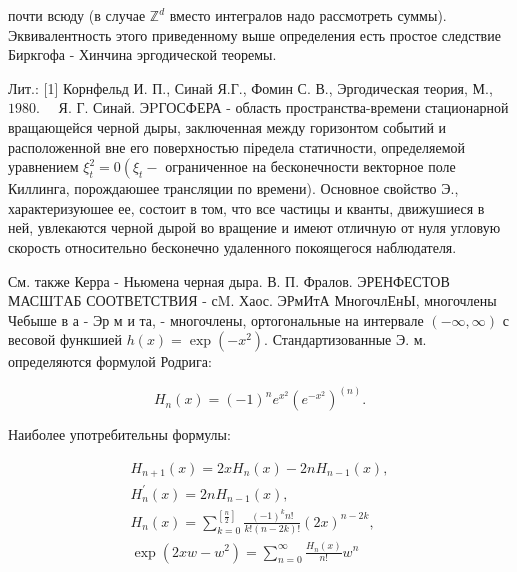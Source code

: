 \documentclass[10pt]{article}
\begin{document}
почти всюду (в случае $\mathbb{Z}^{d}$ вместо интегралов надо рассмотреть суммы). Эквивалентность этого приведенному выше определения есть простое следствие Биркгофа - Хинчина эргодической теоремы.



Лит.: [1] Корнфельд И. П., Синай Я.Г., Фомин С. В., Эргодическая теория, М., $1980 . \quad$ Я. Г. Синай. ЭPГОСФЕРА - область пространства-времени стационарной вращающейся черной дыры, заключенная между горизонтом событий и расположенной вне его поверхностью піредела статичности, определяемой уравнением $\xi_{t}^{2}=0\left(\xi_{t}-\right.$ ограниченное на бесконечности векторное поле Киллинга, порождаюшее трансляции по времени). Основное свойство Э., характеризуюшее ее, состоит в том, что все частицы и кванты, движушиеся в ней, увлекаются черной дырой во вращение и имеют отличную от нуля угловую скорость относительно бесконечно удаленного покоящегося наблюдателя.



См. также Керра - Ньюмена черная дыра. В. П. Фралов. ЭРЕНФЕСТОВ МАСШTАБ СООТВЕТСТВИЯ - сM. Хаос. ЭРмИтА МногочлЕнЫ, многочлены Чебыше в а - Эр м и та, - многочлены, ортогональные на интервале $(-\infty, \infty)$ с весовой функшией $h(x)=\exp \left(-x^{2}\right)$. Стандартизованные Э. м. определяются формулой Родрига:



\[

H_{n}(x)=(-1)^{n} e^{x^{2}}\left(e^{-x^{2}}\right)^{(n)} .

\]



Наиболее употребительны формулы:



\[

\begin{gathered}

H_{n+1}(x)=2 x H_{n}(x)-2 n H_{n-1}(x), \\

H_{n}^{\prime}(x)=2 n H_{n-1}(x), \\

H_{n}(x)=\sum_{k=0}^{\left[\frac{n}{2}\right]} \frac{(-1)^{k} n !}{k !(n-2 k) !}(2 x)^{n-2 k}, \\

\exp \left(2 x w-w^{2}\right)=\sum_{n=0}^{\infty} \frac{H_{n}(x)}{n !} w^{n}

\end{gathered}

\]
\end{document}
